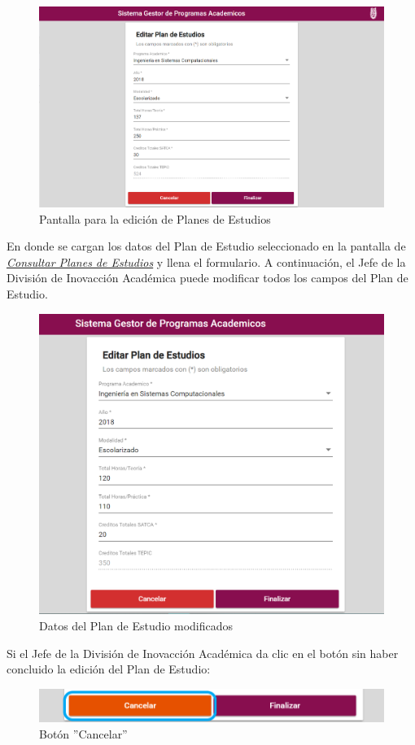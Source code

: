 \begin{figure}[H]
	\centering
	\hypertarget{editarPE}{\includegraphics[width=0.7\linewidth]{images/SP4-GPE/editarPE}}
	\caption{Pantalla para la edición de Planes de Estudios}
	\label{editarPE}
\end{figure}

En donde se cargan los datos del Plan de Estudio seleccionado en la pantalla de \hyperlink{consultarPE}{\textit{Consultar Planes de Estudios}} y llena el formulario.
\newpage
A continuación, el Jefe de la División de Inovacción Académica puede modificar todos los campos del Plan de Estudio.
\begin{figure}[H]
	\centering
	\hypertarget{modif}{\includegraphics[width=0.7\linewidth]{images/SP4-GPE/editarPE1}}
	\caption{Datos del Plan de Estudio modificados}
	\label{modif}
\end{figure}

 Si el Jefe de la División de Inovacción Académica da clic en el botón  sin haber concluido la edición del Plan de Estudio:

\begin{figure}[H]
	\centering
	\hypertarget{cancel2}{\includegraphics[width=0.7\linewidth]{images/SP4-GPE/cancelarPE}}
	\caption{Botón ''Cancelar''}
	\label{cancel2}
\end{figure}
\newpage

